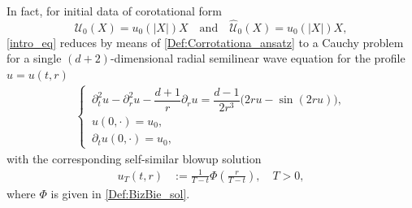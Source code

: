 \documentclass[12pt,reqno]{amsart}
\theoremstyle{plain}
\theoremstyle{remark}
\theoremstyle{plain}
\theoremstyle{definition}
\numberwithin{equation}{section}
\numberwithin{equation}{section}
\begin{document}
	In fact, for initial data of corotational form
	\begin{equation}\label{Def:Corot_data}
		\mathcal{U}_0(X)=u_0(|X|) X \quad \text{and} \quad  \hat{\mathcal{U}}_{0}(X)=\hat{u}_0(|X|)X,
	\end{equation}
	\eqref{intro_eq} reduces by means of \eqref{Def:Corrotationa_ansatz} to a Cauchy problem for a single $(d + 2)$-dimensional radial semilinear wave equation for the profile $u = u(t, r)$
	\begin{align}\label{intro_eq_2}
		\begin{cases}
			\,\partial_{t}^2 u-\partial_{r}^2 u-\dfrac{d+1}{r}\partial_{r} u=\dfrac{d-1}{2 r^3}\big(2r u-\sin (2r u)\big),\\
			\,u(0,\cdot)=u_0,\\
			\,\partial_t u(0,\cdot)=\hat{u}_0,
		\end{cases}    
	\end{align}
	with the corresponding self-similar blowup solution
	\begin{align}\label{blow_up_explicit}
		u_{T}(t,r)&:=\frac{1}{T-t}\Phi\left(\frac{r}{T-t}\right), \quad T>0,
	\end{align}
	where $\Phi$ is given in  \eqref{Def:BizBie_sol}.
	
\end{document}
